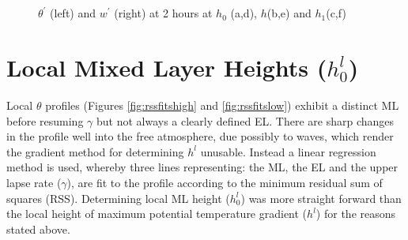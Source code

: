 \begin{figure}[htbp]
\caption{$\theta^{'}$ (left) and $w^{'}$ (right) at 2 hours at $h_{0}$ (a,d), $h$(b,e) and $h_{1}$(c,f)}
\begin{minipage}[b]{0.5\linewidth} 
        
        \\
        \\ 
 \end{minipage}             
\quad
\begin{minipage}[b]{0.5\linewidth}
        \\
       
       \\
        
\end{minipage}
        
        \label{fig:conts1}
\end{figure}

\clearpage

\section{Local Mixed Layer Heights ($h_{0}^{l}$)}
\label{sec:locmlh}     
\FloatBarrier

Local $\theta$ profiles (Figures \ref{fig:rssfitshigh} and \ref{fig:rssfitslow}) exhibit a distinct 
\acs{ML} before resuming $\gamma$ but 
not always a clearly defined \acs{EL}.  There are sharp changes in the profile well into the free 
atmosphere, due possibly to waves, which render the gradient method for determining $h^{l}$ 
unusable.  Instead a linear regression method is used, whereby three lines representing: the
 \acs{ML}, the \acs{EL} and the upper lapse rate ($\gamma$), are fit to the profile according 
to the minimum residual sum of squares (RSS).  Determining local \acs{ML} height ($h_{0}^{l}$) was 
more straight forward than the local height of maximum potential temperature gradient 
($h^{l}$) for the reasons stated above.\\  

